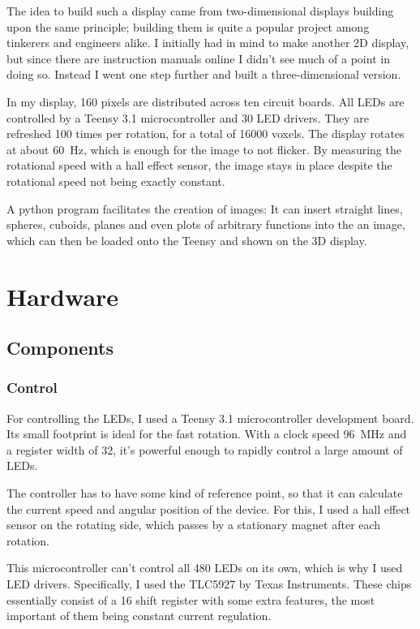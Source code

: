 \documentclass[a4paper, 11pt, titlepage]{article}
\begin{document}
The idea to build such a display came from two-dimensional displays building upon the same
principle; building them is quite a popular project among tinkerers and engineers alike. I
initially had in mind to make another 2D display, but since there are instruction manuals online I
didn't see much of a point in doing so. Instead I went one step further and built a
three-dimensional version.

In my display, 160 pixels are distributed across ten circuit boards. All LEDs are controlled by a
Teensy 3.1 microcontroller and 30 LED drivers. They are refreshed 100 times per rotation, for a
total of 16000 voxels. The display rotates at about \SI{60}{\hertz}, which is enough for the image
to not flicker. By measuring the rotational speed with a hall effect sensor, the image stays in
place despite the rotational speed not being exactly constant.

A python program facilitates the creation of images: It can insert straight lines, spheres,
cuboids, planes and even plots of arbitrary functions into the an image, which can then be loaded
onto the Teensy and shown on the 3D display.


\section{Hardware}

\subsection{Components}

\subsubsection{Control}

For controlling the LEDs, I used a Teensy 3.1 microcontroller development board. Its small
footprint is ideal for the fast rotation. With a clock speed \SI{96}{\mega\hertz} and a register
width of \SI{32}{\bit}, it's powerful enough to rapidly control a large amount of LEDs.

The controller has to have some kind of reference point, so that it can calculate the current
speed and angular position of the device. For this, I used a hall effect sensor on the rotating
side, which passes by a stationary magnet after each rotation.

This microcontroller can't control all 480 LEDs on its own, which is why I used LED drivers.
Specifically, I used the TLC5927 by Texas Instruments. These chips essentially consist of a
\SI{16}{\bit} shift register with some extra features, the most important of them being constant
current regulation.
\end{document}
